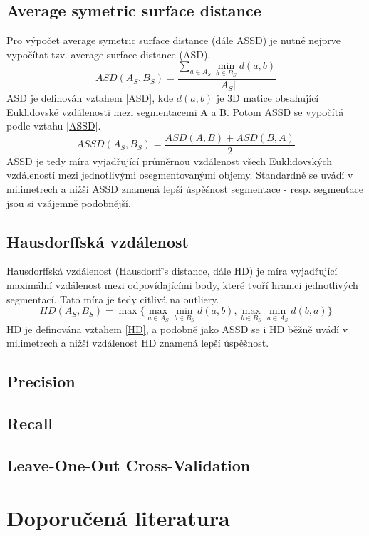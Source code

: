 \documentclass[11pt]{article}
\begin{document}
\subsection{Average symetric surface distance}
Pro výpočet average symetric surface distance (dále ASSD) je nutné nejprve vypočítat tzv. average surface distance (ASD).
\begin{equation}
	\label{ASD}
	ASD(A_S, B_S) = \frac{\sum_{a \in A_S} \min_{b \in B_S} d(a,b)}{|A_S|}
\end{equation}
ASD je definován vztahem \ref{ASD}, kde $d(a,b)$ je 3D matice obsahující Euklidovské vzdálenosti mezi segmentacemi A a B. Potom ASSD se vypočítá podle vztahu \ref{ASSD}.
\begin{equation}
	\label{ASSD}
	ASSD(A_S, B_S) = \frac{ASD(A, B) + ASD(B, A)}{2}
\end{equation}
ASSD je tedy míra vyjadřující průměrnou vzdálenost všech Euklidovských vzdáleností mezi jednotlivými osegmentovanými objemy. Standardně se uvádí v milimetrech a nižší ASSD znamená lepší úspěšnost segmentace - resp. segmentace jsou si vzájemně podobnější.

\subsection{Hausdorffská vzdálenost}
Hausdorffská vzdálenost (Hausdorff's distance, dále HD) je míra vyjadřující maximální vzdálenost mezi odpovídajícími body, které tvoří hranici jednotlivých segmentací. Tato míra je tedy citlivá na \alert{outliery}.
\begin{equation}
	\label{HD}
	HD(A_S, B_S) = \max \{\max_{a \in A_S}\min_{b \in B_S} d(a,b), \max_{b \in B_S}\min_{a \in A_S} d(b,a)\}
\end{equation}
HD je definována vztahem \ref{HD}, a podobně jako ASSD se i HD běžně uvádí v milimetrech a nižší vzdálenost HD znamená lepší úspěšnost.

\subsection{Precision}
\subsection{Recall}
\subsection{Leave-One-Out Cross-Validation}

\section{Doporučená literatura}
\end{document}
